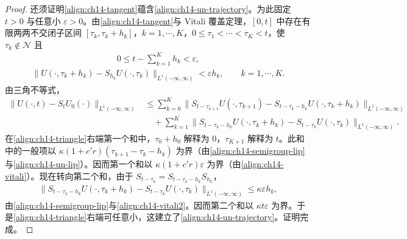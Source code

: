 \documentclass[../../main.tex]{subfiles}
\begin{document}
\begin{proof}
还须证明\eqref{align:ch14-tangent}蕴含\eqref{align:ch14-un-trajectory}。为此固定 $t>0$ 与任意小 $\varepsilon>0$。由\eqref{align:ch14-tangent}与 Vitali 覆盖定理，$[0,t]$ 中存在有限两两不交闭子区间 $[\tau_k,\tau_k+h_k]$，$k=1,\cdots,K$，$0\leqslant\tau_1<\cdots<\tau_K<t$，使 $\tau_k\notin\mathscr{N}$ 且
\begin{align}
0\leqslant t-\sum_{k=1}^K h_k<\varepsilon,
\label{align:ch14-vitali}
\end{align}
\begin{align}
\|U(\cdot,\tau_k+h_k)-S_{h_k}U(\cdot,\tau_k)\|_{L^1(-\infty,\infty)}<\varepsilon h_k,\qquad k=1,\cdots,K.
\label{align:ch14-vitali2}
\end{align}
由三角不等式，
\begin{align}
\|U(\cdot,t)-S_tU_0(\cdot)\|_{L^1(-\infty,\infty)}&\leqslant\sum_{k=0}^K\|S_{t-\tau_{k+1}}U(\cdot,\tau_{k+1})-S_{t-\tau_k-h_k}U(\cdot,\tau_k+h_k)\|_{L^1(-\infty,\infty)}\nonumber\\
&\quad+\sum_{k=1}^K\|S_{t-\tau_k-h_k}U(\cdot,\tau_k+h_k)-S_{t-\tau_k}U(\cdot,\tau_k)\|_{L^1(-\infty,\infty)}.
\label{align:ch14-triangle}
\end{align}
在\eqref{align:ch14-triangle}右端第一个和中，$\tau_0+h_0$ 解释为 $0$，$\tau_{K+1}$ 解释为 $t$。此和中的一般项以 $\kappa(1+c'r)(\tau_{k+1}-\tau_k-h_k)$ 为界（由\eqref{align:ch14-semigroup-lip}与\eqref{align:ch14-un-lip}）。因而第一个和以 $\kappa(1+c'r)\varepsilon$ 为界（由\eqref{align:ch14-vitali}）。现在转向第二个和，由于 $S_{t-\tau_k}=S_{t-\tau_k-h_k}S_{h_k}$，
\begin{align}
\|S_{t-\tau_k-h_k}U(\cdot,\tau_k+h_k)-S_{t-\tau_k}U(\cdot,\tau_k)\|_{L^1(-\infty,\infty)}\leqslant\kappa\varepsilon h_k,
\label{align:ch14-second-sum}
\end{align}
由\eqref{align:ch14-semigroup-lip}与\eqref{align:ch14-vitali2}。因而第二个和以 $\kappa t\varepsilon$ 为界。于是\eqref{align:ch14-triangle}右端可任意小，这建立了\eqref{align:ch14-un-trajectory}。证明完成。
\end{proof}
\end{document}
